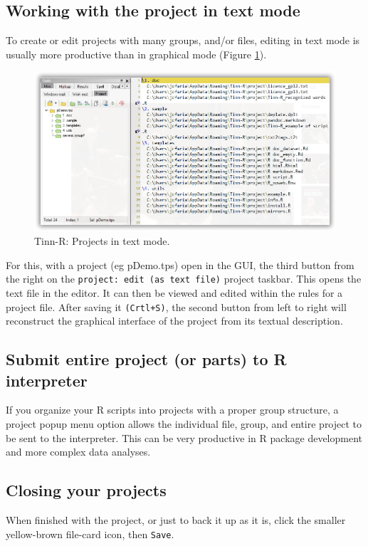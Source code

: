 \subsection{Working with the project in text mode}
To create or edit projects with many groups, and/or files, editing in text mode is usually 
more productive than in graphical mode (Figure \ref{fig:tinn-r_projects_text_mode}).

\begin{figure}[H]
  \begin{center}
    \includegraphics[scale=0.60]{./res/projects_text_mode.png}
  \end{center}
  \caption{Tinn-R: Projects in text mode.}
  \label{fig:tinn-r_projects_text_mode}
\end{figure}

For this, with a project (eg pDemo.tps) open in the GUI, the third button from the right  
on the \texttt{project: edit (as text file)} project taskbar.  This opens the text file in the editor. 
It can then be viewed and edited within the rules for a project file.  
After saving it \texttt{(Crtl+S)}, the second button from left to right will reconstruct the  
graphical interface of the project from its textual description.

\subsection{Submit entire project (or parts) to R interpreter}
If you organize your R scripts into projects with a proper group structure, a project popup menu option allows the individual file, 
group, and entire project to be sent to the interpreter. This can be very productive in R package development and more complex data analyses.

\subsection{Closing your projects}
When finished with the project, or just to back it up as it is, click the smaller yellow-brown file-card icon, then \texttt{Save}.
